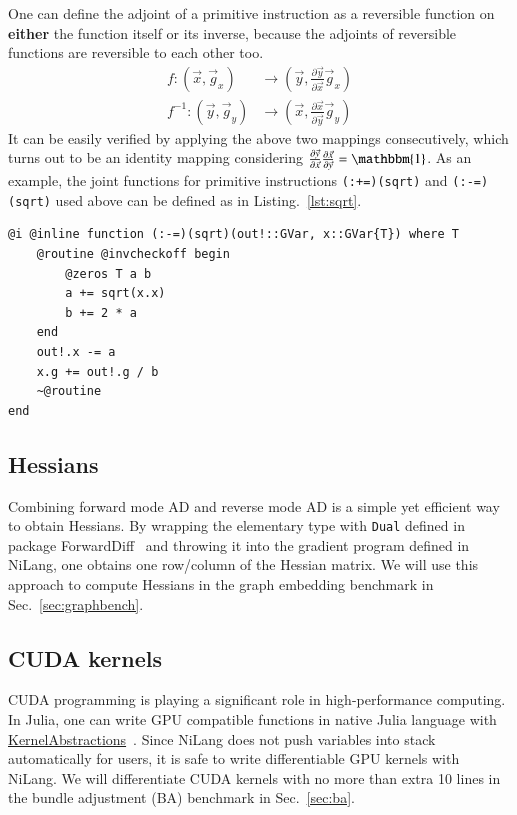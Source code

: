\documentclass{article}
\newcommand{\<}{\langle}
\renewcommand{\>}{\rangle}
\newcommand{\Lst}[1]{Listing.~\ref{#1}}
\newcommand{\Sec}[1]{Sec.~\ref{#1}}
\theoremstyle{definition}\newtheorem{definition}{\textit{Definition}}
\begin{document}
One can define the adjoint of a primitive instruction as a reversible function on \textbf{either} the function itself or its inverse, because the adjoints of reversible functions are reversible to each other too.
\begin{align}
    f: (\vec x, \vec g_x) &\rightarrow (\vec y, \frac{\partial \vec y}{\partial \vec x}\vec g_x)\\
    f^{-1}: (\vec y, \vec g_y) &\rightarrow (\vec x, \frac{\partial \vec x}{\partial \vec y}\vec g_y)
\end{align}
It can be easily verified by applying the above two mappings consecutively, which turns out to be an identity mapping considering $\frac{\partial \vec y}{\partial \vec x} \frac{\partial \vec x}{\partial \vec y} = \mathbbm{1}$.
As an example, the joint functions for primitive instructions \texttt{(:+=)(sqrt)} and \texttt{(:-=)(sqrt)} used above can be defined as in \Lst{lst:sqrt}.

\begin{minipage}{.88\textwidth}
    \begin{lstlisting}[mathescape=true,caption={Adjoints for primitives \texttt{(:+=)(sqrt)} and \texttt{(:-=)(sqrt)}.},label={lst:sqrt}, frame=tlrb]
@i @inline function (:-=)(sqrt)(out!::GVar, x::GVar{T}) where T
    @routine @invcheckoff begin
        @zeros T a b
        a += sqrt(x.x)
        b += 2 * a
    end
    out!.x -= a
    x.g += out!.g / b
    ~@routine
end
\end{lstlisting}
\end{minipage}

\subsection{Hessians}
Combining forward mode AD and reverse mode AD is a simple yet efficient way to obtain Hessians.
By wrapping the elementary type with \texttt{Dual} defined in package ForwardDiff~\cite{Revels2016} and throwing it into the gradient program defined in NiLang, one obtains one row/column of the Hessian matrix.
We will use this approach to compute Hessians in the graph embedding benchmark in \Sec{sec:graphbench}.

\subsection{CUDA kernels}
CUDA programming is playing a significant role in high-performance computing. In Julia, one can write GPU compatible functions in native Julia language with \href{https://github.com/JuliaGPU/KernelAbstractions.jl}{KernelAbstractions}~\cite{Besard2018}.
Since NiLang does not push variables into stack automatically for users, it is safe to write differentiable GPU kernels with NiLang.
We will differentiate CUDA kernels with no more than extra 10 lines in the bundle adjustment (BA) benchmark in \Sec{sec:ba}.
\end{document}
